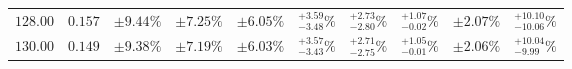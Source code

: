\begin{table}[ht!]
{{\begin{tabular}{| cc | ccc | cccc | c |}
$128.00$ & $0.157$ & $\pm9.44\%$ & {\color{black!55}$\pm 7.25\%$} & {\color{black!55}$\pm 6.05\%$} & $^{+3.59}_{-3.48}\%$ & {\color{black!55}$^{+2.73}_{-2.80}\%$} & {\color{black!55}$^{+1.07}_{-0.02}\%$} & {\color{black!55}$\pm 2.07\%$} & $^{+10.10}_{-10.06}\%$  \\
$130.00$ & $0.149$ & $\pm9.38\%$ & {\color{black!55}$\pm 7.19\%$} & {\color{black!55}$\pm 6.03\%$} & $^{+3.57}_{-3.43}\%$ & {\color{black!55}$^{+2.71}_{-2.75}\%$} & {\color{black!55}$^{+1.05}_{-0.01}\%$} & {\color{black!55}$\pm 2.06\%$} & $^{+10.04}_{-9.99}\%$  \\
\cline{1-10}
\end{tabular}
}
}
\end{table}

